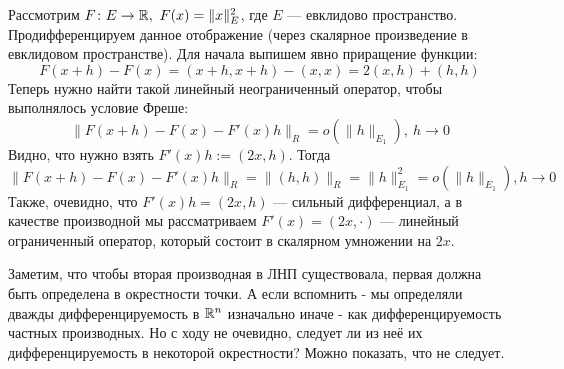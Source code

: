\begin{example}
    Рассмотрим $F \colon E \to \R,\ F(x)=\|x\|_E^2$, где $E$ --- евклидово пространство. Продифференцируем данное отображение (через скалярное произведение в евклидовом пространстве). Для начала выпишем явно приращение функции:
    \[
        F(x + h) - F(x) = (x + h, x + h) - (x, x) = 2(x, h) + (h, h)
    \]
    Теперь нужно найти такой линейный неограниченный оператор, чтобы выполнялось условие Фреше:
    \[
        \|F(x + h) - F(x) - F'(x)h\|_R = o(\|h\|_{E_1}),\ h \to 0
    \]
    Видно, что нужно взять $F'(x)h := (2x, h)$. Тогда
    \[
        \|F(x + h) - F(x) - F'(x)h\|_R = \|(h, h)\|_R = \|h\|^2_{E_1} = o(\|h\|_{E_1}), h \to 0
    \]
    Также, очевидно, что $F'(x)h = (2x, h)$ --- сильный дифференциал, а в качестве производной мы рассматриваем $F'(x)=(2x, \cdot)$ --- линейный ограниченный оператор, который состоит в скалярном умножении на $2x$.
\end{example}

\begin{note}
	Заметим, что чтобы вторая производная в ЛНП существовала, первая должна быть определена в окрестности точки. А если вспомнить - мы определяли дважды дифференцируемость в $\mathbb{R}^n$ изначально иначе - как дифференцируемость частных производных. Но с ходу не очевидно, следует ли из неё их дифференцируемость в некоторой окрестности? Можно показать, что не следует.
\end{note}